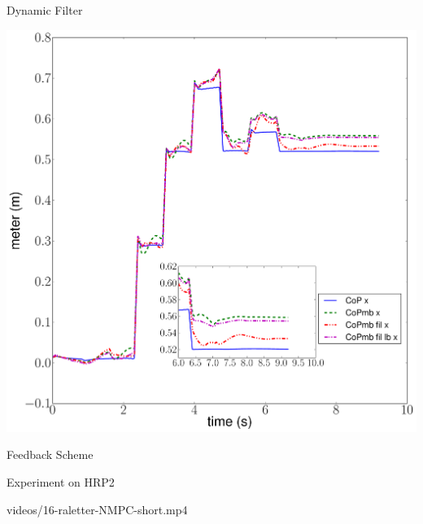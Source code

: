\begin{frame}{Dynamic Filter}
\vspace*{-1cm}
  \begin{center}
    \includegraphics[height=0.8\textheight, keepaspectratio]
      {./figures/nmpc_walkgen/copmbpres.pdf}    
  \end{center}
\end{frame}


\begin{frame}{Feedback Scheme}

\begin{center}
  \hspace*{-1cm}
  \scalebox{0.7}{}
\end{center}

\end{frame}


\begin{frame}{Experiment on HRP2}
  \begin{center}
    {videos/16-raletter-NMPC-short.mp4}
  \end{center}
\end{frame}


